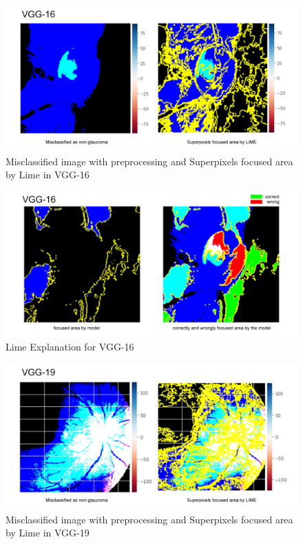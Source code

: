 \documentclass[conference]{IEEEtran}
\begin{document}
\begin{figure}[hbt!]
\centering
\includegraphics[scale=0.24]{fig-46.png}
\caption{Misclassified image with preprocessing and Superpixels focused area by Lime in VGG-16}
\label{fig:x Misclassified image with preprocessing and Superpixels focused area by Lime in VGG-16}
\end{figure}

\begin{figure}[hbt!]
\centering
\includegraphics[scale=0.24]{fig-47.png}
\caption{Lime Explanation for VGG-16}
\label{fig:x Lime Explanation for VGG-16}
\end{figure}

\begin{figure}[hbt!]
\centering
\includegraphics[scale=0.24]{fig-48.png}
\caption{Misclassified image with preprocessing and Superpixels focused area by Lime in VGG-19}
\label{fig:x Misclassified image with preprocessing and Superpixels focused area by Lime in VGG-19}
\end{figure}
\end{document}
